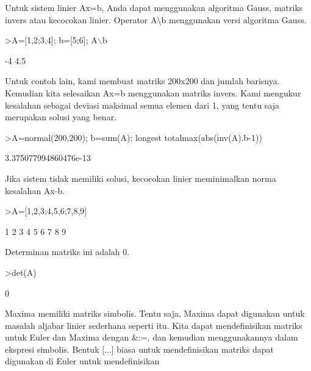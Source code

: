 \documentclass[a4paper,10pt]{article}
\begin{document}
\begin{eulernotebook}
\begin{eulercomment}
\begin{eulercomment}
\begin{eulercomment}
\begin{eulercomment}
\begin{eulercomment}
\begin{eulercomment}
\begin{eulercomment}
Untuk sistem linier Ax=b, Anda dapat menggunakan algoritma Gauss,
matriks invers atau kecocokan linier. Operator A\textbackslash{}b menggunakan versi
algoritma Gauss.
\end{eulercomment}
\begin{eulerprompt}
>A=[1,2;3,4]; b=[5;6]; A\(\backslash\)b
\end{eulerprompt}
\begin{euleroutput}
             -4 
            4.5 
\end{euleroutput}
\begin{eulercomment}
Untuk contoh lain, kami membuat matriks 200x200 dan jumlah barisnya.
Kemudian kita selesaikan Ax=b menggunakan matriks invers. Kami
mengukur kesalahan sebagai deviasi maksimal semua elemen dari 1, yang
tentu saja merupakan solusi yang benar.
\end{eulercomment}
\begin{eulerprompt}
>A=normal(200,200); b=sum(A); longest totalmax(abs(inv(A).b-1))
\end{eulerprompt}
\begin{euleroutput}
    3.375077994860476e-13 
\end{euleroutput}
\begin{eulercomment}
Jika sistem tidak memiliki solusi, kecocokan linier meminimalkan norma
kesalahan Ax-b.
\end{eulercomment}
\begin{eulerprompt}
>A=[1,2,3;4,5,6;7,8,9]
\end{eulerprompt}
\begin{euleroutput}
              1             2             3 
              4             5             6 
              7             8             9 
\end{euleroutput}
\begin{eulercomment}
Determinan matriks ini adalah 0.
\end{eulercomment}
\begin{eulerprompt}
>det(A)
\end{eulerprompt}
\begin{euleroutput}
  0
\end{euleroutput}
\begin{eulercomment}
Maxima memiliki matriks simbolis. Tentu saja, Maxima dapat digunakan
untuk masalah aljabar linier sederhana seperti itu. Kita dapat
mendefinisikan matriks untuk Euler dan Maxima dengan \&:=, dan kemudian
menggunakannya dalam ekspresi simbolis. Bentuk [...] biasa untuk
mendefinisikan matriks dapat digunakan di Euler untuk mendefinisikan

\end{eulercomment}
\end{eulercomment}
\end{eulercomment}
\end{eulercomment}
\end{eulercomment}
\end{eulercomment}
\end{eulercomment}
\end{eulernotebook}
\end{document}
